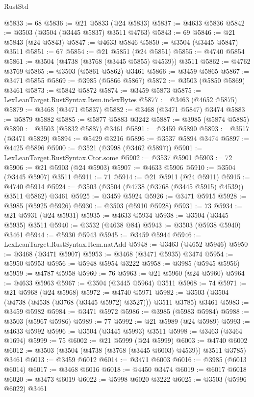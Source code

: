 \begin{lexlean}{RustStd}
\begin{coremodule}
@5833 := 68
@5836 := @21 @5833 (@24 @5833)
@5837 := @4633 @5836
@5842 := @3503 (@3504 (@3445 @5837) @3511 @4763)
@5843 := 69
@5846 := @21 @5843 (@24 @5843)
@5847 := @4633 @5846
@5850 := @3504 (@3445 @5847) @3511
@5851 := 67
@5854 := @21 @5851 (@24 @5851)
@5855 := @4740 @5854
@5861 := @3504 (@4738 (@3768 (@3445 @5855) @4539)) @3511
@5862 := @4762 @3769
@5865 := @3503 (@5861 @5862) @3461
@5866 := @3459 @5865
@5867 := @3471 @5855
@5869 := @3985 (@5866 @5867)
@5872 := @3503 (@5850 @5869) @3461
@5873 := @5842 @5872
@5874 := @3459 @5873
@5875 := LexLeanTarget.RustSyntax.Item.indexBytes
@5877 := @3463 (@4652 @5875)
@5879 := @3468 (@3471 @5837)
@5882 := @3468 (@3471 @5847) @3474
@5883 := @5879 @5882
@5885 := @5877 @5883 @3242
@5887 := @3985 (@5874 @5885)
@5890 := @3503 (@5832 @5887) @3461
@5891 := @3459 @5890
@5893 := @3517 (@3471 @5829)
@5894 := @5429 @3216
@5896 := @3537 @5894 @3474
@5897 := @4425 @5896
@5900 := @3521 (@3998 (@3462 @5897))
@5901 := LexLeanTarget.RustSyntax.Ctor.some
@5902 := @3537 @5901
@5903 := 72
@5906 := @21 @5903 (@24 @5903)
@5907 := @4633 @5906
@5910 := @3504 (@3445 @5907) @3511
@5911 := 71
@5914 := @21 @5911 (@24 @5911)
@5915 := @4740 @5914
@5924 := @3503 (@3504 (@4738 (@3768 (@3445 @5915) @4539)) @3511 @5862) @3461
@5925 := @3459 @5924
@5926 := @3471 @5915
@5928 := @3985 (@5925 @5926)
@5930 := @3503 (@5910 @5928)
@5931 := 73
@5934 := @21 @5931 (@24 @5931)
@5935 := @4633 @5934
@5938 := @3504 (@3445 @5935) @3511
@5940 := @3532 (@4638 @84)
@5943 := @3503 (@5938 @5940) @3461
@5944 := @5930 @5943
@5945 := @3459 @5944
@5946 := LexLeanTarget.RustSyntax.Item.natAdd
@5948 := @3463 (@4652 @5946)
@5950 := @3468 (@3471 @5907)
@5953 := @3468 (@3471 @5935) @3474
@5954 := @5950 @5953
@5956 := @5948 @5954 @3222
@5958 := @3985 (@5945 @5956)
@5959 := @4787 @5958
@5960 := 76
@5963 := @21 @5960 (@24 @5960)
@5964 := @4633 @5963
@5967 := @3504 (@3445 @5964) @3511
@5968 := 74
@5971 := @21 @5968 (@24 @5968)
@5972 := @4740 @5971
@5982 := @3503 (@3504 (@4738 (@4538 (@3768 (@3445 @5972) @3527))) @3511 @3785) @3461
@5983 := @3459 @5982
@5984 := @3471 @5972
@5986 := @3985 (@5983 @5984)
@5988 := @3503 (@5967 @5986)
@5989 := 77
@5992 := @21 @5989 (@24 @5989)
@5993 := @4633 @5992
@5996 := @3504 (@3445 @5993) @3511
@5998 := @3463 (@3464 @1694)
@5999 := 75
@6002 := @21 @5999 (@24 @5999)
@6003 := @4740 @6002
@6012 := @3503 (@3504 (@4738 (@3768 (@3445 @6003) @4539)) @3511 @3785) @3461
@6013 := @3459 @6012
@6014 := @3471 @6003
@6016 := @3985 (@6013 @6014)
@6017 := @3468 @6016
@6018 := @4450 @3474
@6019 := @6017 @6018
@6020 := @3473 @6019
@6022 := @5998 @6020 @3222
@6025 := @3503 (@5996 @6022) @3461

\end{coremodule}
\end{lexlean}
